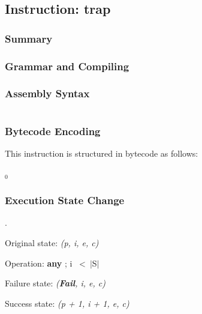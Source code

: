 \subsection{Instruction: trap}

\subsubsection{Summary}

\subsubsection{Grammar and Compiling}

\subsubsection{Assembly Syntax}

\begin{myquote}
\begin{verbatim}

\end{verbatim}
\end{myquote}

\subsubsection{Bytecode Encoding}

This instruction is structured in bytecode as follows:

$_0$\ 

\subsubsection{Execution State Change}

.

Original state: \textit{(p, i, e, c)}

Operation: \textbf{any} ; i \ \textless \ $\vert$S$\vert$

Failure state: \textit{(\textbf{Fail}, i, e, c)}

Success state: \textit{(p + 1, i + 1, e, c)}


